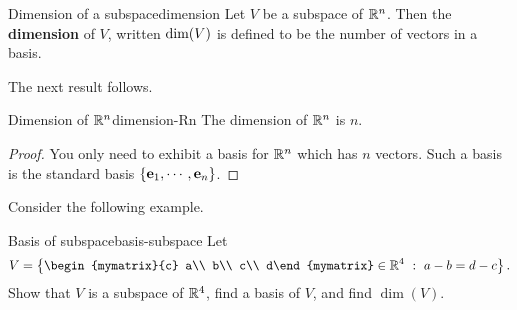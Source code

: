 \begin{definition}{Dimension of a subspace}{dimension}
  Let $V$ be a subspace of $\mathbb{R}^{n}$. Then the \textbf{dimension }of
  $V$, written $\mbox{\rm dim}(V)$ is defined to be the number of vectors
  in a basis.
\end{definition}

The next result follows.

\begin{corollary}{Dimension of $\mathbb{R}^n$}{dimension-Rn}
  The dimension of $\mathbb{R}^{n}$ is $n$.
\end{corollary}

\begin{proof}
  You only need to exhibit a basis for $\mathbb{R}^{n}$ which has $n$
  vectors. Such a basis is the standard basis
  $\left\{\mbox{\bf e}_{1},\cdots , \mbox{\bf e}_{n}\right\}$.
\end{proof}

Consider the following example.

\begin{example}{Basis of subspace}{basis-subspace}
  Let 
  \[ V=\set{
      \begin{mymatrix}{c} a\\ b\\ c\\ d\end{mymatrix}\in\R^4 ~:~
      a-b=d-c }.\] Show that $V$ is a subspace of $\mathbb{R}^4$, find a basis
  of $V$, and find $\dim(V)$.
\end{example}

